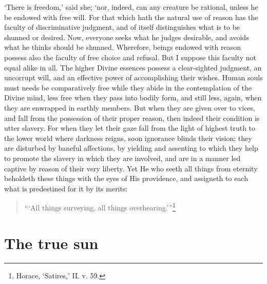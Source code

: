 \documentclass[11pt]{book}
\begin{document}
`There is freedom,' said she; `nor, indeed, can any creature be
rational, unless he be endowed with free will. For that which hath the
natural use of reason has the faculty of discriminative judgment, and of
itself distinguishes what is to be shunned or desired. Now, everyone
seeks what he judges desirable, and avoids what he thinks should be
shunned. Wherefore, beings endowed with reason possess also the faculty
of free choice and refusal. But I suppose this faculty not equal alike
in all. The higher Divine essences possess a clear-sighted judgment, an
uncorrupt will, and an effective power of accomplishing their wishes.
Human souls must needs be comparatively free while they abide in the
contemplation of the Divine mind, less free when they pass into bodily
form, and still less, again, when they are enwrapped in earthly members.
But when they are given over to vices, and fall from the possession of
their proper reason, then indeed their condition is utter slavery. For
when they let their gaze fall from the light of highest truth to the
lower world where darkness reigns, soon ignorance blinds their vision;
they are disturbed by baneful affections, by yielding and assenting to
which they help to promote the slavery in which they are involved, and
are in a manner led captive by reason of their very liberty. Yet He who
seeth all things from eternity beholdeth these things with the eyes of
His providence, and assigneth to each what is predestined for it by its
merits:

\begin{quote}
  ```All things surveying, all things overhearing.'''\footnote{Horace, ‘Satires,’ II. v. 59.}
\end{quote}



\section{The true sun}
\end{document}
